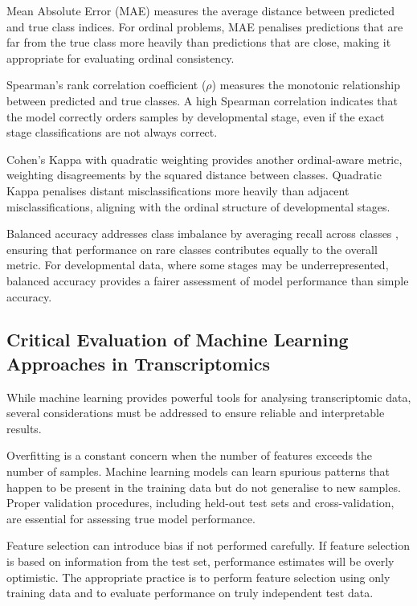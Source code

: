 Mean Absolute Error (MAE) measures the average distance between predicted and true class indices. For ordinal problems, MAE penalises predictions that are far from the true class more heavily than predictions that are close, making it appropriate for evaluating ordinal consistency.

Spearman's rank correlation coefficient ($\rho$) measures the monotonic relationship between predicted and true classes. A high Spearman correlation indicates that the model correctly orders samples by developmental stage, even if the exact stage classifications are not always correct.

Cohen's Kappa with quadratic weighting provides another ordinal-aware metric, weighting disagreements by the squared distance between classes. Quadratic Kappa penalises distant misclassifications more heavily than adjacent misclassifications, aligning with the ordinal structure of developmental stages.

Balanced accuracy addresses class imbalance by averaging recall across classes \parencite{greener_guide_2022}, ensuring that performance on rare classes contributes equally to the overall metric. For developmental data, where some stages may be underrepresented, balanced accuracy provides a fairer assessment of model performance than simple accuracy.

\subsection{Critical Evaluation of Machine Learning Approaches in Transcriptomics}

While machine learning provides powerful tools for analysing transcriptomic data, several considerations must be addressed to ensure reliable and interpretable results.

Overfitting is a constant concern when the number of features exceeds the number of samples. Machine learning models can learn spurious patterns that happen to be present in the training data but do not generalise to new samples. Proper validation procedures, including held-out test sets and cross-validation, are essential for assessing true model performance.

Feature selection can introduce bias if not performed carefully. If feature selection is based on information from the test set, performance estimates will be overly optimistic. The appropriate practice is to perform feature selection using only training data and to evaluate performance on truly independent test data.

